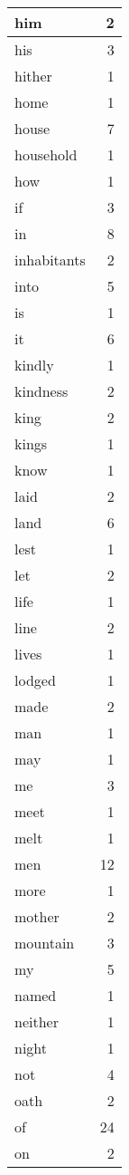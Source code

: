 \begin{center}
\begin{longtable}{l|r}
him & 2 \\ \hline
his & 3 \\ \hline
hither & 1 \\ \hline
home & 1 \\ \hline
house & 7 \\ \hline
household & 1 \\ \hline
how & 1 \\ \hline
if & 3 \\ \hline
in & 8 \\ \hline
inhabitants & 2 \\ \hline
into & 5 \\ \hline
is & 1 \\ \hline
it & 6 \\ \hline
kindly & 1 \\ \hline
kindness & 2 \\ \hline
king & 2 \\ \hline
kings & 1 \\ \hline
know & 1 \\ \hline
laid & 2 \\ \hline
land & 6 \\ \hline
lest & 1 \\ \hline
let & 2 \\ \hline
life & 1 \\ \hline
line & 2 \\ \hline
lives & 1 \\ \hline
lodged & 1 \\ \hline
made & 2 \\ \hline
man & 1 \\ \hline
may & 1 \\ \hline
me & 3 \\ \hline
meet & 1 \\ \hline
melt & 1 \\ \hline
men & 12 \\ \hline
more & 1 \\ \hline
mother & 2 \\ \hline
mountain & 3 \\ \hline
my & 5 \\ \hline
named & 1 \\ \hline
neither & 1 \\ \hline
night & 1 \\ \hline
not & 4 \\ \hline
oath & 2 \\ \hline
of & 24 \\ \hline
on & 2 \\ \hline

\end{longtable}
\end{center}
